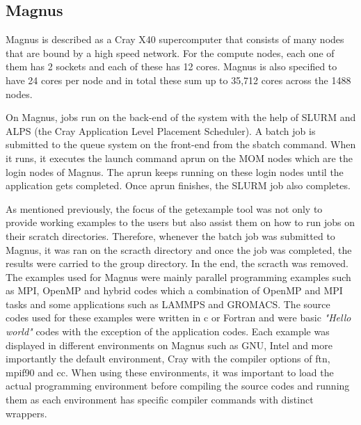 \subsection{Magnus}

Magnus is described as a Cray X40 supercomputer that consists of many nodes that are bound by a high speed network. For the compute nodes, each one 
of them has 2 sockets and each of these has 12 cores. Magnus is also specified to have 24 cores per node and in total these sum up to 35,712 cores across 
the 1488 nodes. 

On Magnus, jobs run on the back-end of the system with the help of SLURM and ALPS (the Cray Application Level Placement Scheduler). A batch job is 
submitted to the queue system on the front-end from the sbatch command. When it runs, it executes the launch command aprun on the MOM nodes 
which are the login nodes of Magnus. The aprun keeps running on these login nodes until the application gets completed. Once aprun finishes, the SLURM 
job also completes.

As mentioned previously, the focus of the getexample tool was not only to provide working examples to the users but also assist them on how to run jobs
on their scratch directories. Therefore, whenever the batch job was submitted to Magnus, it was ran on the scracth directory and once the job was 
completed, the results were carried to the group directory. In the end, the scracth was removed. The examples used for Magnus were mainly parallel
programming examples such as MPI, OpenMP and hybrid codes which a combination of OpenMP and MPI tasks and some applications such as LAMMPS and GROMACS.
The source codes used for these examples were written in c or Fortran and were basic \emph{"Hello world"} codes with the exception of the application codes.
Each example was displayed in different environments on Magnus such as GNU, Intel and more importantly the default environment, Cray with the compiler
options of ftn, mpif90 and cc. When using these environments, it was important to load the actual programming environment before compiling the source
codes and running them as each environment has specific compiler commands with distinct wrappers.
